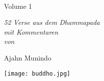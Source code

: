 \cleartorecto
\thispagestyle{empty}

\vspace*{1em}

{\centering

\\[0.4\baselineskip]
Volume 1
\vspace*{3\baselineskip}

{\itshape 52 Verse aus dem Dhammapada\\
mit Kommentaren\\
von}

\vspace*{2\baselineskip}
Ajahn Munindo

\vfill

\texttt{[image: buddho.jpg]}
\vspace*{1.3em}


}
